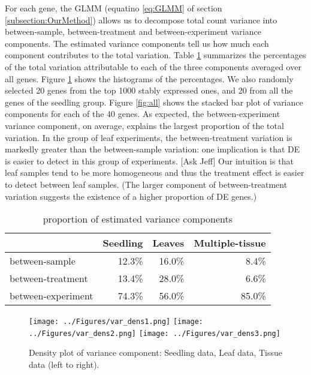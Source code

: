 \documentclass[11pt, a4paper]{article}
\begin{document}
For each gene, the GLMM (equatino \ref{eq:GLMM}	of section \ref{subsection:OurMethod}) allows us to decompose
total count variance into between-sample, between-treatment and
between-experiment variance components. The estimated variance components tell us how much each component contributes
to the total variation. Table \ref{table:percentageofvariation} summarizes the percentages of the total variation attributable to each of the three components averaged over all genes. Figure \ref{fig:densityplot} shows the histograms of the percentages. We also randomly selected 20 genes from the top 1000 stably expressed ones, and 20 from all the genes of the seedling group. Figure \ref{fig:all} shows the stacked bar plot of variance components for each of the 40 genes.
As expected, the between-experiment variance component, on average,
explains the largest proportion of the total variation. In the group of leaf
experiments, the between-treatment variation is markedly greater than the
between-sample variation: one implication is that DE is easier to detect in
this group of experiments.  [Ask Jeff] Our intuition is
that leaf samples tend to be more homogeneous and thus the treatment effect is
easier to detect between leaf samples. (The larger component of
between-treatment variation suggests the existence of a higher proportion of
DE genes.) 
 
 \begin{center}
 \begin{table}[h!]
 	\centering
 	\caption{proportion of estimated variance components}
	 \label{table:percentageofvariation}
 	\begin{tabular}{lrrr}\hline
 		& Seedling & Leaves & Multiple-tissue \\  \hline
 		between-sample     & 12.3\%   & 16.0\% & 8.4\%           \\
 		between-treatment  & 13.4\%   & 28.0\% & 6.6\%           \\
 		between-experiment & 74.3\%   & 56.0\% & 85.0\%         \\ \hline
 	\end{tabular}
 \end{table}
\end{center}

 \begin{figure}[h]
\begin{center}
\texttt{[image: ../Figures/var\_dens1.png]}
\texttt{[image: ../Figures/var\_dens2.png]}
\texttt{[image: ../Figures/var\_dens3.png]}
\caption{ Density plot of variance component: Seedling data, Leaf data, Tissue data (left to right).}
\label{fig:densityplot}
\end{center}
\end{figure} 
\end{document}
